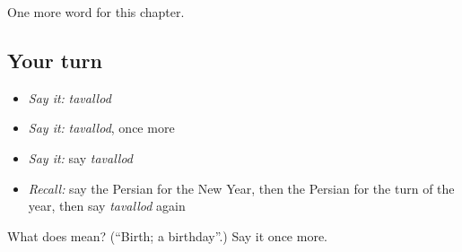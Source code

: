 \begin{grammarlens}[title={What you've built}]
One more word for this chapter.
\end{grammarlens}

\subsection*{Your turn}
\begin{itemize}
\raggedright
  \item \emph{Say it:} \emph{tavallod}
  \item \emph{Say it:} \emph{tavallod}, once more
  \item \emph{Say it:} say \emph{tavallod}
  \item \emph{Recall:} say the Persian for the New Year, then the Persian for the turn of the year, then say \emph{tavallod} again
\end{itemize}

\begin{tcolorbox}[breakable,colback=teal!4,colframe=teal!35!black,title={Before you move on}]
What does  mean? (\textquotedblleft{}Birth; a birthday\textquotedblright{}.) Say it once more.
\end{tcolorbox}
